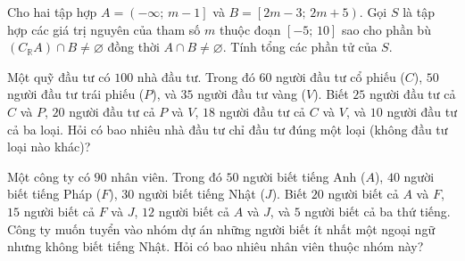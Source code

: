\begin{bt}%
	Cho hai tập hợp $A=\left(-\infty;\, m-1\right]$ và $B=\left[2m-3;\, 2m+5\right)$. Gọi $S$ là tập hợp các giá trị nguyên của tham số $m$ thuộc đoạn $[-5;\,10]$ sao cho phần bù $\left(C_{\mathbb{R}}A\right)\cap B\neq\varnothing$ đồng thời $A\cap B\neq\varnothing$. Tính tổng các phần tử của $S$.
	
\end{bt}

\begin{bt}%
	Một quỹ đầu tư có $100$ nhà đầu tư. Trong đó $60$ người đầu tư cổ phiếu ($C$), $50$ người đầu tư trái phiếu ($P$), và $35$ người đầu tư vàng ($V$). Biết $25$ người đầu tư cả $C$ và $P$, $20$ người đầu tư cả $P$ và $V$, $18$ người đầu tư cả $C$ và $V$, và $10$ người đầu tư cả ba loại. Hỏi có bao nhiêu nhà đầu tư chỉ đầu tư đúng một loại (không đầu tư loại nào khác)?
	
\end{bt}

\begin{bt}%
	Một công ty có $90$ nhân viên. Trong đó $50$ người biết tiếng Anh ($A$), $40$ người biết tiếng Pháp ($F$), $30$ người biết tiếng Nhật ($J$). Biết $20$ người biết cả $A$ và $F$, $15$ người biết cả $F$ và $J$, $12$ người biết cả $A$ và $J$, và $5$ người biết cả ba thứ tiếng. Công ty muốn tuyển vào nhóm dự án những người biết ít nhất một ngoại ngữ nhưng không biết tiếng Nhật. Hỏi có bao nhiêu nhân viên thuộc nhóm này?
	
\end{bt}

